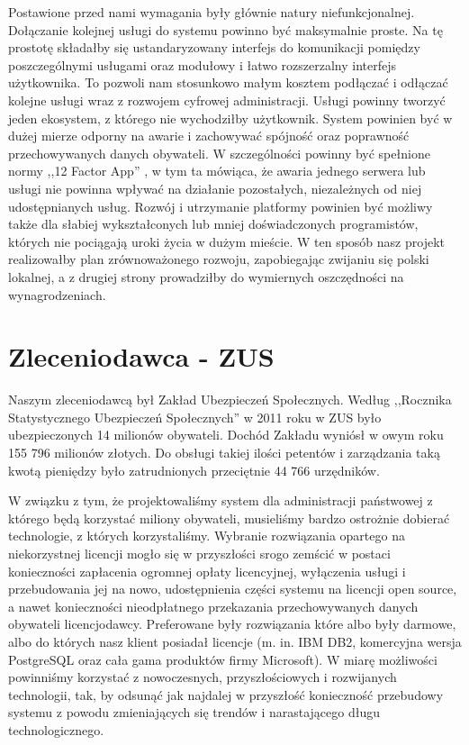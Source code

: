 \documentclass[licencjacka]{pracamgr}
\begin{document}
Postawione przed nami wymagania były głównie natury niefunkcjonalnej. Dołączanie kolejnej usługi do systemu
powinno być maksymalnie proste. Na tę prostotę składałby się ustandaryzowany interfejs do komunikacji pomiędzy
poszczególnymi usługami oraz modułowy i łatwo rozszerzalny interfejs użytkownika.
To pozwoli nam stosunkowo małym kosztem podłączać i odłączać kolejne usługi wraz z
rozwojem cyfrowej administracji. Usługi powinny tworzyć jeden ekosystem, z którego nie wychodziłby użytkownik. System
powinien być w dużej mierze odporny na awarie i zachowywać spójność oraz poprawność przechowywanych danych obywateli.
W szczególności powinny być spełnione normy ,,12 Factor App'' \cite{tfa}, w tym ta mówiąca, że awaria jednego serwera
lub usługi nie powinna wpływać na działanie pozostałych, niezależnych od niej udostępnianych usług.
Rozwój i utrzymanie platformy powinien być możliwy także dla słabiej wykształconych lub mniej doświadczonych
programistów, których nie pociągają uroki życia w dużym mieście. W ten sposób nasz projekt realizowałby plan
zrównoważonego rozwoju, zapobiegając zwijaniu się polski lokalnej, a z drugiej strony prowadziłby do wymiernych
oszczędności na wynagrodzeniach.

\section{Zleceniodawca - ZUS}

Naszym zleceniodawcą był Zakład Ubezpieczeń Społecznych. Według ,,Rocznika
Statystycznego Ubezpieczeń Społecznych'' \cite{rocznik} w 2011 roku w ZUS było ubezpieczonych
14 milionów obywateli. Dochód Zakładu wyniósł w owym roku 155 796 milionów
złotych. Do obsługi takiej ilości petentów i zarządzania taką kwotą pieniędzy
było zatrudnionych przeciętnie 44 766 urzędników.

W związku z tym, że projektowaliśmy system dla administracji państwowej z
którego będą korzystać miliony obywateli, musieliśmy bardzo ostrożnie dobierać
technologie, z których korzystaliśmy. Wybranie rozwiązania opartego na
niekorzystnej licencji mogło się w przyszłości srogo zemścić w postaci
konieczności zapłacenia ogromnej opłaty licencyjnej, wyłączenia usługi i
przebudowania jej na nowo, udostępnienia części systemu na licencji open source,
a nawet konieczności nieodpłatnego przekazania przechowywanych danych obywateli
licencjodawcy. Preferowane były rozwiązania które albo były darmowe, albo do
których nasz klient posiadał licencje (m. in. IBM DB2, komercyjna wersja
PostgreSQL oraz cała gama produktów firmy Microsoft). W miarę możliwości
powinniśmy korzystać z nowoczesnych, przyszłościowych i rozwijanych technologii,
tak, by odsunąć jak najdalej w przyszłość konieczność przebudowy systemu z
powodu zmieniających się trendów i narastającego długu technologicznego.
\end{document}
